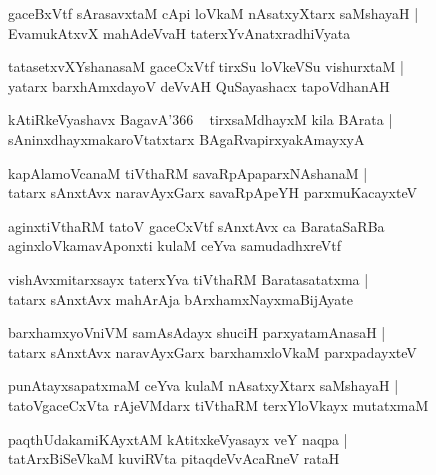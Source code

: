 \documentclass[twoside,12pt,openright]{book}
\newcounter{shloka}[chapter]
\begin{document}
\begin{shloka}
gaceBxVtf sArasavxtaM cApi loVkaM nAsatxyXtarx saMshayaH |\\
EvamukAtxvX mahAdeVvaH taterxYvAnatxradhiVyata
\end{shloka}

\begin{shloka}
tatasetxvXYshanasaM  gaceCxVtf tirxSu loVkeVSu vishurxtaM |\\
yatarx barxhAmxdayoV deVvAH QuSayashacx tapoVdhanAH 
\end{shloka}

\begin{shloka}
kAtiRkeVyashavx BagavA\char'366 ~ tirxsaMdhayxM kila BArata |\\
sAninxdhayxmakaroVtatxtarx BAgaRvapirxyakAmayxyA
\end{shloka}

\begin{shloka}
kapAlamoVcanaM tiVthaRM savaRpApaparxNAshanaM |\\
tatarx sAnxtAvx naravAyxGarx savaRpApeYH parxmuKacayxteV 
\end{shloka}

\begin{shloka}
aginxtiVthaRM tatoV gaceCxVtf sAnxtAvx ca BarataSaRBa
aginxloVkamavAponxti kulaM ceYva samudadhxreVtf 
\end{shloka}

\begin{shloka}
vishAvxmitarxsayx taterxYva tiVthaRM Baratasatatxma |\\
tatarx sAnxtAvx mahArAja bArxhamxNayxmaBijAyate
\end{shloka}

\begin{shloka}
barxhamxyoVniVM samAsAdayx shuciH parxyatamAnasaH |\\
tatarx sAnxtAvx naravAyxGarx barxhamxloVkaM parxpadayxteV 
\end{shloka}

\begin{shloka}
punAtayxsapatxmaM ceYva kulaM nAsatxyXtarx saMshayaH |\\
tatoVgaceCxVta rAjeVMdarx tiVthaRM terxYloVkayx mutatxmaM 
\end{shloka}

\begin{shloka}
paqthUdakamiKAyxtAM kAtitxkeVyasayx veY naqpa |\\
tatArxBiSeVkaM kuviRVta pitaqdeVvAcaRneV rataH 
\end{shloka}
\end{document}
